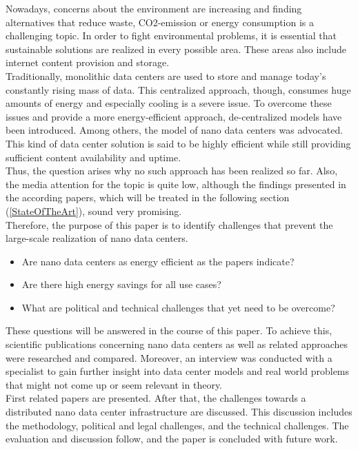Nowadays, concerns about the environment are increasing and finding alternatives that reduce waste, CO2-emission or energy consumption is a challenging topic. In order to fight environmental problems, it is essential that sustainable solutions are realized in every possible area. These areas also include internet content provision and storage.\\ Traditionally, monolithic data centers are used to store and manage today's constantly rising mass of data. This centralized approach, though, consumes huge amounts of energy and especially cooling is a severe issue. To overcome these issues and provide a more energy-efficient approach, de-centralized models have been introduced. Among others, the model of nano data centers was advocated. This kind of data center solution is said to be highly efficient while still providing sufficient content availability and uptime.\\ 
Thus, the question arises why no such approach has been realized so far. Also, the media attention for the topic is quite low, although the findings presented in the according papers, which will be treated in the following section (\autoref{StateOfTheArt}), sound very promising. \\
Therefore, the purpose of this paper is to identify challenges that prevent the large-scale realization of nano data centers. 
\begin{itemize}
\item Are nano data centers as energy efficient as the papers indicate? 
\item Are there high energy savings for all use cases? 
\item What are political and technical challenges that yet need to be overcome? 
\end{itemize}
These questions will be answered in the course of this paper. To achieve this, scientific publications concerning nano data centers as well as related approaches were researched and compared. Moreover, an interview was conducted with a specialist to gain further insight into data center models and real world problems that might not come up or seem relevant in theory.\\
First related papers are presented. After that, the challenges towards a distributed nano data center infrastructure are discussed. This discussion includes the methodology, political and legal challenges, and the technical challenges. The evaluation and discussion follow, and the paper is concluded with future work. 


